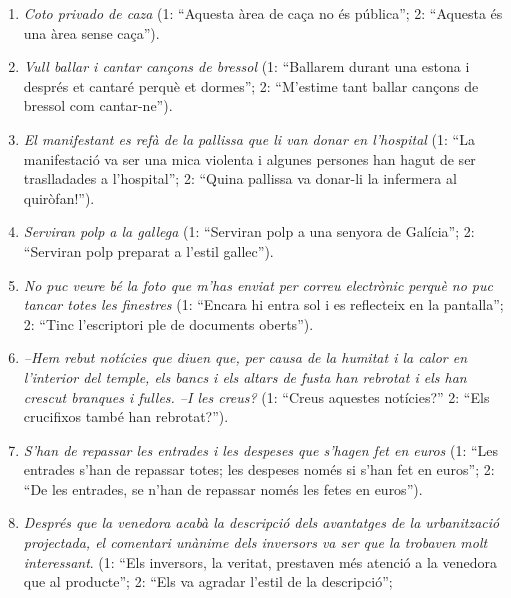 \begin{enumerate}
\begin{enumerate}
{    policia} (1: ``Els lladres van ser capturats pel comissari a una
    fàbrica abandonada''; 2: ``La fàbrica on van ser capturats va ser
    l'objectiu d'un agent piròman'').
  \item \emph{Coto privado de caza} (1: ``Aquesta àrea de caça no és
    pública''; 2: ``Aquesta és una àrea sense caça'').
  \item \emph{Vull ballar i cantar cançons de bressol} (1: ``Ballarem
    durant una estona i després et cantaré perquè et dormes''; 2:
    ``M'estime tant ballar cançons de bressol com cantar-ne'').
  \item \emph{El manifestant es refà de la pallissa que li van donar en
    l'hospital} (1: ``La manifestació va ser una mica violenta i
    algunes persones han hagut de ser traslladades a l'hospital''; 2:
    ``Quina pallissa va donar-li la infermera al quiròfan!'').
  \item \emph{Serviran polp a la gallega} (1: ``Serviran polp a una senyora
    de Galícia''; 2: ``Serviran polp preparat a l'estil gallec'').
  \item \emph{No puc veure bé la foto que m'has enviat per correu
      electrònic perquè no puc tancar totes les finestres} (1:
    ``Encara hi entra sol i es reflecteix en la pantalla''; 2: ``Tinc
    l'escriptori ple de documents oberts'').
  \item \emph{--Hem rebut notícies que diuen que, per causa de
      la humitat i la calor en l'interior del temple, els bancs i els
      altars de fusta han rebrotat i els han crescut branques i
      fulles.  --I les creus?} (1: ``Creus aquestes notícies?'' 2:
    ``Els crucifixos també han rebrotat?'').
  \item \emph{S'han de repassar les entrades i les despeses que
      s'hagen fet en euros} (1: ``Les entrades s'han de repassar
    totes; les despeses només si s'han fet en euros''; 2: ``De les
    entrades, se n'han de repassar només les fetes en euros'').
  \item \emph{Després que la venedora acabà la descripció dels
      avantatges de la urbanització projectada, el comentari unànime
      dels inversors va ser que la trobaven molt interessant}. (1:
    ``Els inversors, la veritat, prestaven més atenció a la venedora
    que al producte''; 2: ``Els va agradar l'estil de la descripció'';

\end{enumerate}
\end{enumerate}
